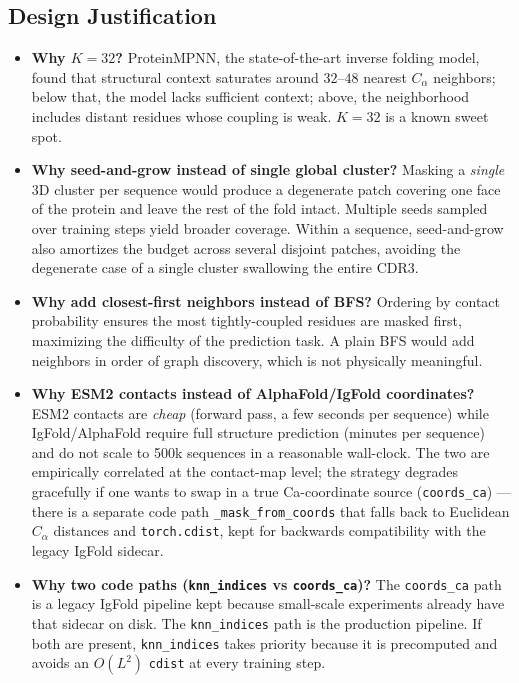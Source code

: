 \documentclass[11pt]{article}
\begin{document}
\subsection{Design Justification}
\begin{itemize}
\item \textbf{Why $K = 32$?} ProteinMPNN, the state-of-the-art inverse
folding model, found that structural context saturates around $32$--$48$
nearest $C_\alpha$ neighbors; below that, the model lacks sufficient
context; above, the neighborhood includes distant residues whose
coupling is weak. $K = 32$ is a known sweet spot.
\item \textbf{Why seed-and-grow instead of single global cluster?}
Masking a \emph{single} 3D cluster per sequence would produce a
degenerate patch covering one face of the protein and leave the rest
of the fold intact. Multiple seeds sampled over training steps yield
broader coverage. Within a sequence, seed-and-grow also amortizes the
budget across several disjoint patches, avoiding the degenerate case
of a single cluster swallowing the entire CDR3.
\item \textbf{Why add closest-first neighbors instead of BFS?} Ordering
by contact probability ensures the most tightly-coupled residues are
masked first, maximizing the difficulty of the prediction task. A
plain BFS would add neighbors in order of graph discovery, which is
not physically meaningful.
\item \textbf{Why ESM2 contacts instead of AlphaFold/IgFold coordinates?}
ESM2 contacts are \emph{cheap} (forward pass, a few seconds per
sequence) while IgFold/AlphaFold require full structure prediction
(minutes per sequence) and do not scale to 500k sequences in a
reasonable wall-clock. The two are empirically correlated at the
contact-map level; the strategy degrades gracefully if one wants to
swap in a true Ca-coordinate source (\texttt{coords\_ca}) --- there
is a separate code path \texttt{\_mask\_from\_coords} that falls back
to Euclidean $C_\alpha$ distances and \texttt{torch.cdist}, kept for
backwards compatibility with the legacy IgFold sidecar.
\item \textbf{Why two code paths (\texttt{knn\_indices} vs
\texttt{coords\_ca})?} The \texttt{coords\_ca} path is a legacy IgFold
pipeline kept because small-scale experiments already have that
sidecar on disk. The \texttt{knn\_indices} path is the production
pipeline. If both are present, \texttt{knn\_indices} takes priority
because it is precomputed and avoids an $O(L^2)$ \texttt{cdist} at
every training step.

\end{itemize}
\end{document}
